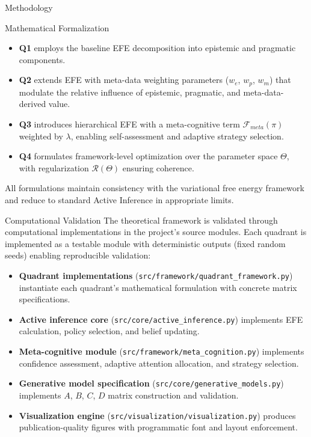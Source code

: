 \documentclass[
  ignorenonframetext,
]{beamer}
\providecommand{\tightlist}{%
  \setlength{\itemsep}{0pt}\setlength{\parskip}{0pt}}
\begin{document}
\begin{frame}[fragile]{Methodology}
\begin{block}{Mathematical Formalization}
\begin{itemize}
\tightlist
\item
  \textbf{Q1} employs the baseline EFE decomposition into epistemic and
  pragmatic components.
\item
  \textbf{Q2} extends EFE with meta-data weighting parameters (\(w_e\),
  \(w_p\), \(w_m\)) that modulate the relative influence of epistemic,
  pragmatic, and meta-data-derived value.
\item
  \textbf{Q3} introduces hierarchical EFE with a meta-cognitive term
  \(\mathcal{F}_{meta}(\pi)\) weighted by \(\lambda\), enabling
  self-assessment and adaptive strategy selection.
\item
  \textbf{Q4} formulates framework-level optimization over the parameter
  space \(\Theta\), with regularization \(\mathcal{R}(\Theta)\) ensuring
  coherence.
\end{itemize}

All formulations maintain consistency with the variational free energy
framework and reduce to standard Active Inference in appropriate limits.
\end{block}

\begin{block}{Computational Validation}
\protect{}\label{computational-validation}
The theoretical framework is validated through computational
implementations in the project's source modules. Each quadrant is
implemented as a testable module with deterministic outputs (fixed
random seeds) enabling reproducible validation:

\begin{itemize}
\tightlist
\item
  \textbf{Quadrant implementations}
  (\texttt{src/framework/quadrant\_framework.py}) instantiate each
  quadrant's mathematical formulation with concrete matrix
  specifications.
\item
  \textbf{Active inference core}
  (\texttt{src/core/active\_inference.py}) implements EFE calculation,
  policy selection, and belief updating.
\item
  \textbf{Meta-cognitive module}
  (\texttt{src/framework/meta\_cognition.py}) implements confidence
  assessment, adaptive attention allocation, and strategy selection.
\item
  \textbf{Generative model specification}
  (\texttt{src/core/generative\_models.py}) implements \(A\), \(B\),
  \(C\), \(D\) matrix construction and validation.
\item
  \textbf{Visualization engine}
  (\texttt{src/visualization/visualization.py}) produces
  publication-quality figures with programmatic font and layout
  enforcement.
\end{itemize}


\end{block}
\end{frame}
\end{document}
